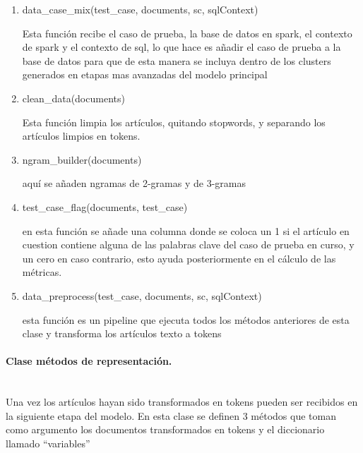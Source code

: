 \documentclass[12pt]{article}
\newcommand{\subsubsubsection}[1]{\paragraph{#1}\mbox{}\\}
\begin{document}
				\begin{enumerate}
					\item data\_case\_mix(test\_case, documents, sc, sqlContext)
			
					Esta función recibe el caso de prueba, la base de datos en spark, el contexto de spark y el contexto de sql, lo que hace es añadir el caso de prueba a la base de datos para que de esta manera se incluya dentro de los clusters generados en etapas mas avanzadas del modelo principal
					
					\item clean\_data(documents)
					
					Esta función limpia los artículos, quitando stopwords, y separando los artículos limpios en tokens.
					
					\item ngram\_builder(documents)
					
					aquí se añaden ngramas de 2-gramas y de 3-gramas
					
					\item test\_case\_flag(documents, test\_case)
					
					en esta función se añade una columna donde se coloca un 1 si el artículo en cuestion contiene alguna de las palabras clave del caso de prueba en curso, y un cero en caso contrario, esto ayuda posteriormente en el cálculo de las métricas.
					
					\item data\_preprocess(test\_case, documents, sc, sqlContext)
					
					esta función es un pipeline que ejecuta todos los métodos anteriores de esta clase y transforma los artículos texto a tokens
				\end{enumerate}
						
					
				\subsubsubsection{Clase métodos de representación.}
				Una vez los artículos hayan sido transformados en tokens pueden ser recibidos en la siguiente etapa del modelo.
				En esta clase se definen 3 métodos que toman como argumento los documentos transformados en tokens y el diccionario llamado ``variables'' 
			
\end{document}
